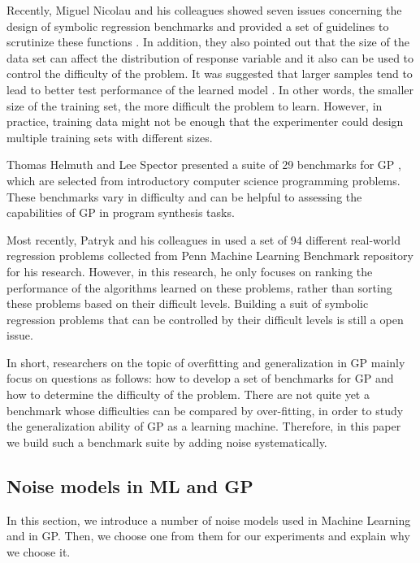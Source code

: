 Recently, Miguel Nicolau and his colleagues showed seven issues concerning the design of symbolic regression benchmarks and provided a set of guidelines to scrutinize these functions \cite{2015Mig}. In addition, they also pointed out that the size of the data set can affect the distribution of response variable and it also can be used to control the difficulty of the problem. It was suggested that larger samples tend to lead to better test performance of the learned model \cite{2015Mig}. In other words, the smaller size of the training set, the more difficult the problem to learn. However, in practice, training data might not be enough that the experimenter could design multiple training sets with different sizes. \par
Thomas Helmuth and Lee Spector presented a suite of 29 benchmarks for GP \cite{Thomas2015}, which are selected from introductory computer science programming problems. These benchmarks vary in difficulty and can be helpful to assessing the capabilities of GP in program synthesis tasks. \par

Most recently, Patryk and his colleagues in \cite{orzechowski2018we} used a set of 94 different real-world regression problems collected from 
Penn Machine Learning Benchmark repository for his research. However, in this research, he only focuses on ranking the performance of the algorithms learned on these problems, rather than sorting these problems based on their difficult levels. Building a suit of symbolic regression problems that can be controlled by their difficult levels is still a open issue.

In short, researchers on the topic of overfitting and generalization in GP mainly focus on questions as follows: how to develop a set of benchmarks for GP and how to determine the difficulty of the problem. There are not quite yet a  benchmark whose difficulties can be compared by over-fitting, in order to study the generalization ability of GP as a learning machine. Therefore, in this paper we build such a benchmark suite by adding noise systematically.

\subsection {Noise models in ML and GP}
\label{Noi}
In this section, we introduce a number of noise models used  in Machine Learning and in GP. Then, we choose one from them for our experiments and explain why we choose it. \par

